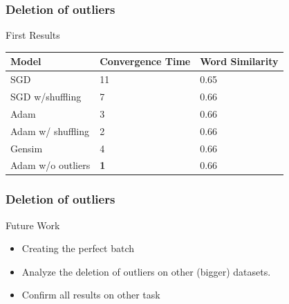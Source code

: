     \begin{frame}
\frametitle{Deletion of outliers}
\begin{Large}
First Results 
\end{Large}
    \begin{table}[]
\begin{tabular}{|l|l|l|}
\hline
Model    & Convergence Time & Word Similarity \\ \hline
SGD & {11}              & 0.65            \\ \hline
SGD w/shuffling & {7}              & 0.66            \\ \hline
Adam & {3}              & 0.66            \\ \hline
Adam w/ shuffling & {2}              & 0.66      \\ \hline
Gensim   & 4          & 0.66            \\ \hline
Adam w/o outliers  & \textbf{1} & 0.66 \\ \hline
\end{tabular}
\end{table}
  \end{frame}
  
  
      \begin{frame}
\frametitle{Deletion of outliers}
\begin{Large}
Future Work 
\end{Large}
\begin{itemize}
\item Creating the perfect batch 
\item Analyze the deletion of outliers on other (bigger) datasets.
\item Confirm all results on other task
\end{itemize}
  \end{frame}